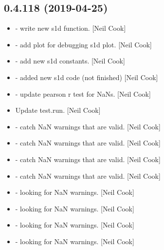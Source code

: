 \documentclass[a4paper,10pt,english]{report}
\begin{document}
\subsection{0.4.118 (2019-04-25)}
\label{\detokenize{misc/changelog:id142}}\begin{itemize}
\item {} 
 - write new s1d function. {[}Neil Cook{]}

\item {} 
 - add  plot for debugging s1d
plot. {[}Neil Cook{]}

\item {} 
 - add new s1d constants. {[}Neil Cook{]}

\item {} 
 - added new s1d code (not finished) {[}Neil
Cook{]}

\item {} 
 - update pearson r test for NaNs. {[}Neil Cook{]}

\item {} 
Update test.run. {[}Neil Cook{]}

\item {} 
 - catch NaN warnings that are valid. {[}Neil Cook{]}

\item {} 
 - catch NaN warnings that are valid. {[}Neil Cook{]}

\item {} 
 - catch NaN warnings that are valid. {[}Neil Cook{]}

\item {} 
 - catch NaN warnings that are valid. {[}Neil Cook{]}

\item {} 
 - looking for NaN warnings. {[}Neil Cook{]}

\item {} 
 - looking for NaN warnings. {[}Neil Cook{]}

\item {} 
 - looking for NaN warnings. {[}Neil Cook{]}

\item {} 
 - looking for NaN warnings. {[}Neil Cook{]}


\end{itemize}
\end{document}
